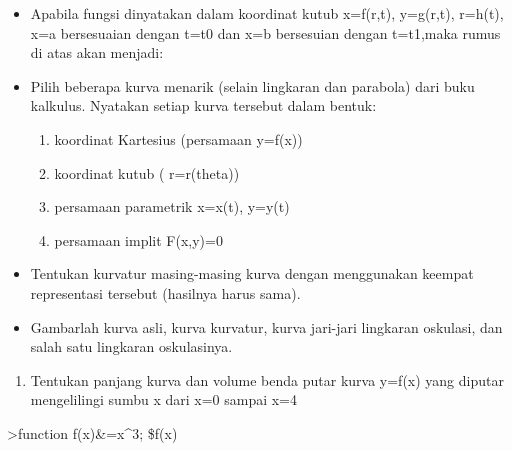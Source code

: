 \documentclass[
]{book}
\providecommand{\tightlist}{%
  \setlength{\itemsep}{0pt}\setlength{\parskip}{0pt}}
\begin{document}
\begin{itemize}
\tightlist
\item
  Apabila fungsi dinyatakan dalam koordinat kutub x=f(r,t), y=g(r,t), r=h(t), x=a bersesuaian dengan t=t0 dan x=b bersesuian dengan t=t1,maka rumus di atas akan menjadi:
\item
  Pilih beberapa kurva menarik (selain lingkaran dan parabola) dari buku kalkulus. Nyatakan setiap kurva tersebut dalam bentuk:

  \begin{enumerate}
  \def\labelenumi{\alph{enumi}.}
  \tightlist
  \item
    koordinat Kartesius (persamaan y=f(x))
  \item
    koordinat kutub ( r=r(theta))
  \item
    persamaan parametrik x=x(t), y=y(t)
  \item
    persamaan implit F(x,y)=0
  \end{enumerate}
\item
  Tentukan kurvatur masing-masing kurva dengan menggunakan keempat representasi tersebut (hasilnya harus sama).
\item
  Gambarlah kurva asli, kurva kurvatur, kurva jari-jari lingkaran oskulasi, dan salah satu lingkaran oskulasinya.
\end{itemize}

\begin{enumerate}
\def\labelenumi{\arabic{enumi}.}
\tightlist
\item
  Tentukan panjang kurva dan volume benda putar kurva y=f(x) yang diputar mengelilingi sumbu x dari x=0 sampai x=4
\end{enumerate}

\textgreater function f(x)\&=x\^{}3; \$f(x)
\end{document}
